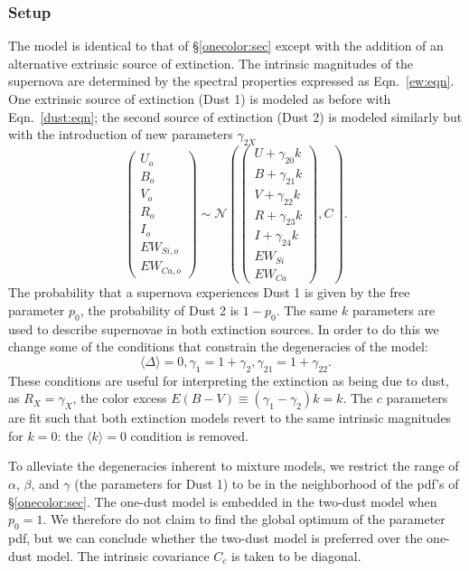 \documentclass[11pt, oneside]{article}   	%
\begin{document}
\subsubsection{Setup}
The model is identical to that of \S\ref{onecolor:sec} except with the addition of an alternative extrinsic source of extinction.
The intrinsic magnitudes of the supernova are determined by the spectral properties expressed as Eqn.~\ref{ew:eqn}.
One extrinsic source of extinction  (Dust 1) is modeled as before with Eqn.~\ref{dust:eqn};
the second source of extinction (Dust 2)
is modeled similarly but with the introduction of new parameters $\gamma_{2X}$
\begin{equation}
\left(
\begin{matrix}
U_o\\B_o\\ V_o\\R_o\\I_o\\EW_{Si, o}\\ EW_{Ca, o}\end{matrix}
\right) \sim \mathcal{N}
\left(
\left(
\begin{matrix}
U +\gamma_{20} k \\B +\gamma_{21} k \\V+\gamma_{22} k\\R+\gamma_{23} k\\I+\gamma_{24} k\\
EW_{Si}\\ EW_{Ca}
\end{matrix}
\right)
,C
\right).
\label{dust2:eqn}
\end{equation}
The probability that a supernova experiences  Dust 1 is given by the free parameter $p_0$,
the probability of Dust 2 is $1-p_0$.  
The same $k$ parameters are used to describe supernovae in both extinction sources.  In order to do this we change
some of the conditions that constrain the degeneracies of the model:
\begin{equation*}
\langle \Delta \rangle=0, \gamma_1 = 1+\gamma_2, \gamma_{21}=1+\gamma_{22}.
\end{equation*}
These conditions are useful for interpreting the extinction as being due to dust, as $R_X = \gamma_X$,
the color excess $E(B-V) \equiv (\gamma_1-\gamma_2)k =k$.
The $c$ parameters  are fit such that both extinction models
revert to the same intrinsic magnitudes for $k=0$: the $\langle k \rangle=0$ condition is removed. 

To alleviate the degeneracies inherent to mixture models, we restrict the range of $\alpha$, $\beta$, and $\gamma$ (the parameters for Dust 1)
to be in the neighborhood of the pdf's of \S\ref{onecolor:sec}.  The one-dust model is embedded in the two-dust model when $p_0=1$.
We therefore do not claim to find the global optimum of the parameter
pdf, but we can conclude whether the two-dust model is preferred over the one-dust model.
The intrinsic covariance $C_c$ is taken to be diagonal.
\end{document}
